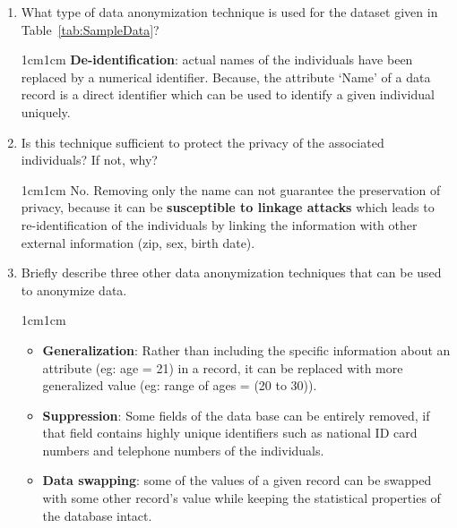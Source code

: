 \documentclass[11pt,letterpaper]{article}
\newenvironment{answer}{\em \color{blue} \begin{adjustwidth}{1cm}{1cm}}{\end{adjustwidth}}
\begin{document}
	\begin{enumerate}
		
		\item What type of data anonymization technique is used for the dataset given in Table~\ref{tab:SampleData}? 
		
		\begin{answer}
			\textbf{De-identification}: actual names of the individuals have been replaced by a numerical identifier. Because, the attribute `Name' of a data record is a direct identifier which can be used to identify a given individual uniquely.
		\end{answer}
		
		\item Is this technique sufficient to protect the privacy of the associated individuals? If not, why?
		
		\begin{answer}
			No. Removing only the name can not guarantee the preservation of privacy, because it can be \textbf{susceptible to linkage attacks} which leads to re-identification of the individuals by linking the information with other external information (zip, sex, birth date).
		\end{answer}
		
		
		
		\item Briefly describe three other data anonymization techniques that can be used to anonymize data.
		
		\begin{answer}
			\begin{itemize}
				\item \textbf{Generalization}: Rather than including the specific information about an attribute (eg: age = 21) in a record, it can be replaced with more generalized value (eg: range of ages = (20 to 30)).
				
				\item \textbf{Suppression}: Some fields of the data base can be entirely removed, if that field contains highly unique identifiers such as national ID card numbers and telephone numbers of the individuals.
				
				\item \textbf{Data swapping}: some of the values of a given record can be swapped with some other record's value while keeping the statistical properties of the database intact.
			\end{itemize}
		\end{answer}
		

\end{enumerate}
\end{document}
